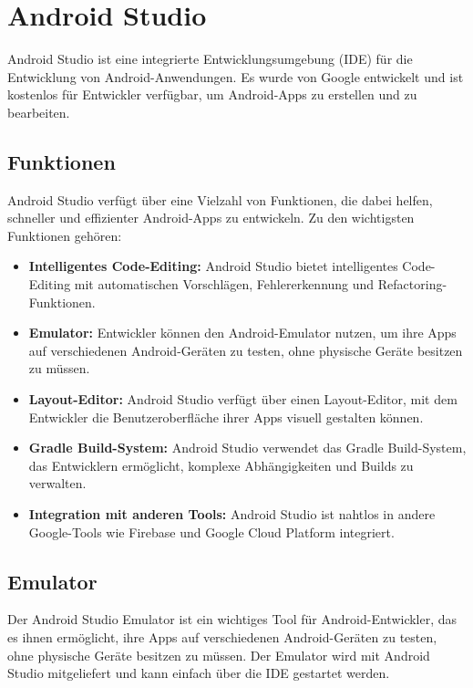     \section{Android Studio}
    Android Studio \cite{AndroidRuntimeChanges} ist eine integrierte Entwicklungsumgebung (IDE) für die Entwicklung von Android-Anwendungen.
    Es wurde von Google entwickelt und ist kostenlos für Entwickler verfügbar, um Android-Apps zu erstellen und zu bearbeiten.

    \subsection{Funktionen}
    Android Studio verfügt über eine Vielzahl von Funktionen, die dabei helfen, schneller und effizienter Android-Apps zu entwickeln. Zu den wichtigsten Funktionen gehören:

    \begin{itemize}
        \item \textbf{Intelligentes Code-Editing:} Android Studio bietet intelligentes Code-Editing mit automatischen Vorschlägen, Fehlererkennung und Refactoring-Funktionen.
        \item \textbf{Emulator:} Entwickler können den Android-Emulator nutzen, um ihre Apps auf verschiedenen Android-Geräten zu testen, ohne physische Geräte besitzen zu müssen.
        \item \textbf{Layout-Editor:} Android Studio verfügt über einen Layout-Editor, mit dem Entwickler die Benutzeroberfläche ihrer Apps visuell gestalten können.
        \item \textbf{Gradle Build-System:} Android Studio verwendet das Gradle Build-System, das Entwicklern ermöglicht, komplexe Abhängigkeiten und Builds zu verwalten.
        \item \textbf{Integration mit anderen Tools:} Android Studio ist nahtlos in andere Google-Tools wie Firebase und Google Cloud Platform integriert.
        \end{itemize}

    \subsection{Emulator}
    Der Android Studio Emulator \cite{AndroidEmulator} ist ein wichtiges Tool für Android-Entwickler, das es ihnen ermöglicht, ihre Apps auf verschiedenen Android-Geräten zu testen, ohne physische Geräte besitzen zu müssen. Der Emulator wird mit Android Studio mitgeliefert und kann einfach über die IDE gestartet werden.

